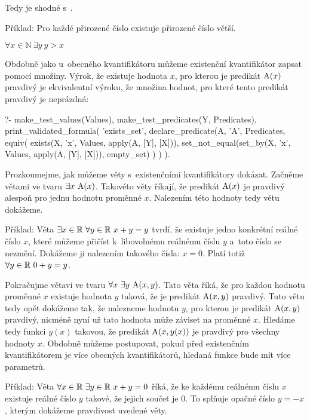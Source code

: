 Tedy  je shodné s~.

Příklad: Pro každé přirozené číslo existuje přirozené číslo větší. 

\(\forall x \in \mathbb{N} \ \exists y \ y > x\)

Obdobně jako u~obecného kvantifikátoru můžeme existenční kvantifikátor zapsat pomocí množiny. Výrok, že existuje hodnota \(x\), pro kterou je predikát \(\mathrm{A}(x)\) pravdivý je ekvivalentní výroku, že množina hodnot, pro které tento predikát pravdivý je neprázdná:

\begin{prolog}
?- 	make_test_values(Values),
	make_test_predicates(Y, Predicates),
	print_validated_formula(
		'exists_set',
		declare_predicate(A, 'A', Predicates,
			equiv(
				exists(X, 'x', Values, apply(A, [Y], [X])),
				set_not_equal(set_by(X, 'x', Values, apply(A, [Y], [X])), empty_set)
			)
		)
	).
\end{prolog}

Prozkoumejme, jak můžeme věty s~existenčními kvantifikátory dokázat. Začněme větami ve tvaru \(\exists x \ \predicate{A}(x)\). Takovéto věty říkají, že predikát \(\mathrm{A}(x)\) je pravdivý alespoň pro jednu hodnotu proměnné \(x\).  Nalezením této hodnoty tedy větu dokážeme.

Příklad: Věta \(\exists x \in \real \ \forall y \in \real \ x + y = y\) tvrdí, že existuje jedno konkrétní reálné číslo \(x\), které můžeme přičíst k~libovolnému reálnému číslu \(y\) a~toto číslo se nezmění. Dokážeme ji nalezením takového čísla: \(x = 0\). Platí totiž \(\forall y \in \mathbb{R} \ 0 + y = y\).

Pokračujme větavi ve tvaru \(\forall x \ \exists y \ \predicate{A}(x, y)\). Tato věta říká, že pro každou hodnotu proměnné \(x\) existuje hodnota \(y\) taková, že je predikát \(\mathrm{A}(x, y)\) pravdivý. Tuto větu tedy opět dokážeme tak, že nalezneme hodnotu \(y\), pro kterou je predikát \(\mathrm{A}(x, y)\) pravdivý, nicméně nyní už tato hodnota může záviset na proměnné \(x\). Hledáme tedy funkci \(y(x)\) takovou, že predikát \(\mathrm{A}(x, y(x))\) je pravdivý pro všechny hodnoty \(x\). Obdobně můžeme postupovat, pokud před existenčním kvantifikátorem je více obecných kvantifikátorů, hledaná funkce bude mít více parametrů.

Příklad: Věta \(\forall x \in \real \ \exists y \in \real \ x + y = 0\) říká, že ke každému reálnému číslu \(x\) existuje reálné číslo \(y\) takové, že jejich součet je 0. To splňuje opačné číslo \(y = -x\), kterým dokážeme pravdivost uvedené věty.


